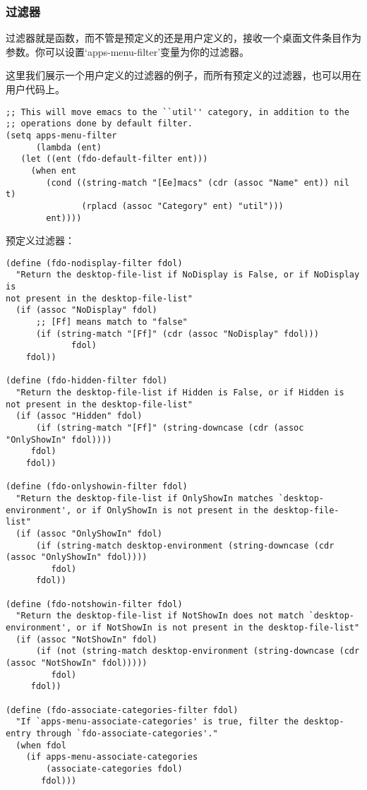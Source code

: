 \documentclass{book}
\begin{document}
\begin{CJK*}{UTF8}{gbsn}
\subsubsection{过滤器}
过滤器就是函数，而不管是预定义的还是用户定义的，接收一个桌面文件条目作为参数。你可以设置`apps-menu-filter'变量为你的过滤器。

这里我们展示一个用户定义的过滤器的例子，而所有预定义的过滤器，也可以用在用户代码上。
\begin{verbatim}
;; This will move emacs to the ``util'' category, in addition to the
;; operations done by default filter.
(setq apps-menu-filter
      (lambda (ent)
   (let ((ent (fdo-default-filter ent)))
     (when ent
     	(cond ((string-match "[Ee]macs" (cdr (assoc "Name" ent)) nil t)
     	       (rplacd (assoc "Category" ent) "util")))
     	ent))))
\end{verbatim}
预定义过滤器：
\begin{verbatim}
(define (fdo-nodisplay-filter fdol)
  "Return the desktop-file-list if NoDisplay is False, or if NoDisplay is
not present in the desktop-file-list"
  (if (assoc "NoDisplay" fdol)
      ;; [Ff] means match to "false"
      (if (string-match "[Ff]" (cdr (assoc "NoDisplay" fdol)))
             fdol)
    fdol))

(define (fdo-hidden-filter fdol)
  "Return the desktop-file-list if Hidden is False, or if Hidden is
not present in the desktop-file-list"
  (if (assoc "Hidden" fdol)
      (if (string-match "[Ff]" (string-downcase (cdr (assoc "OnlyShowIn" fdol))))
     fdol)
    fdol))

(define (fdo-onlyshowin-filter fdol)
  "Return the desktop-file-list if OnlyShowIn matches `desktop-environment', or if OnlyShowIn is not present in the desktop-file-list"
  (if (assoc "OnlyShowIn" fdol)
      (if (string-match desktop-environment (string-downcase (cdr (assoc "OnlyShowIn" fdol))))
     	 fdol)
      fdol))

(define (fdo-notshowin-filter fdol)
  "Return the desktop-file-list if NotShowIn does not match `desktop-environment', or if NotShowIn is not present in the desktop-file-list"
  (if (assoc "NotShowIn" fdol)
      (if (not (string-match desktop-environment (string-downcase (cdr (assoc "NotShowIn" fdol)))))
         fdol)
     fdol))

(define (fdo-associate-categories-filter fdol)
  "If `apps-menu-associate-categories' is true, filter the desktop-entry through `fdo-associate-categories'."
  (when fdol
    (if apps-menu-associate-categories
        (associate-categories fdol)
       fdol)))


\end{verbatim}
\end{CJK*}
\end{document}
